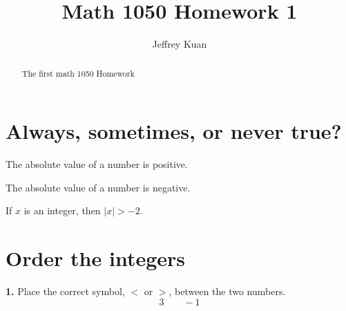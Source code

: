\documentclass{ximera}
\author{Jeffrey Kuan}
\title{Math 1050 Homework 1}
\begin{document}
\begin{abstract}
   The first math 1050 Homework 
\end{abstract}

\maketitle

\section*{Always, sometimes, or never true?}

\begin{problem}
The absolute value of a number is positive. 

\begin{multipleChoice}
\end{multipleChoice}
\end{problem}

\begin{problem}
The absolute value of a number is negative. 

\begin{multipleChoice}
\end{multipleChoice}
\end{problem}

\begin{problem}
If \(x\) is an integer, then \( \vert x \vert>-2\). 

\begin{multipleChoice}
\end{multipleChoice}

\end{problem}


\section*{Order the integers}

\begin{problem}
\textbf{1.} Place the correct symbol, $<$ or $>$, between the two numbers.
\[
3 \qquad -1
\]

\begin{multipleChoice}
\end{multipleChoice}
\end{problem}
\end{document}
